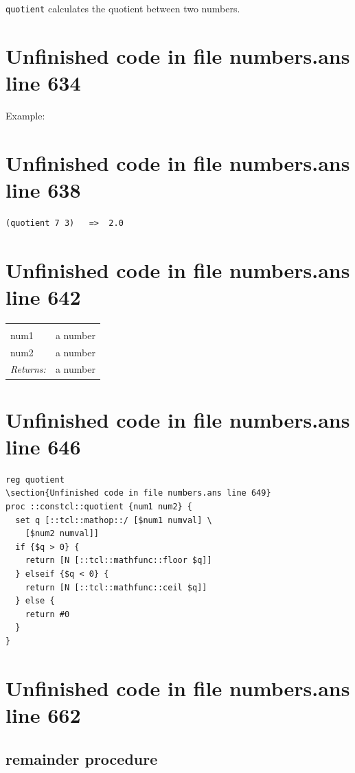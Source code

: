 \documentclass[twoside,9pt]{report}
\begin{document}
\texttt{quotient} calculates the quotient between two numbers.

\section{Unfinished code in file numbers.ans line 634}


Example:

\section{Unfinished code in file numbers.ans line 638}
\begin{verbatim}
(quotient 7 3)   =>  2.0
\end{verbatim}
\section{Unfinished code in file numbers.ans line 642}
\noindent\begin{tabular}{ |p{1.9cm} p{8cm}| }
\hline
\rowcolor[HTML]{CCCCCC} \multicolumn{2}{|l|}{\bf quotient (public)} \\
num1 & a number \\
num2 & a number \\
\textit{Returns:} & a number \\
\hline
\end{tabular}
\section{Unfinished code in file numbers.ans line 646}
\begin{lstlisting}
reg quotient
\section{Unfinished code in file numbers.ans line 649}
proc ::constcl::quotient {num1 num2} {
  set q [::tcl::mathop::/ [$num1 numval] \
    [$num2 numval]]
  if {$q > 0} {
    return [N [::tcl::mathfunc::floor $q]]
  } elseif {$q < 0} {
    return [N [::tcl::mathfunc::ceil $q]]
  } else {
    return #0
  }
}
\end{lstlisting}
\section{Unfinished code in file numbers.ans line 662}
\subsection{remainder procedure}
\label{remainder-procedure}
\end{document}
